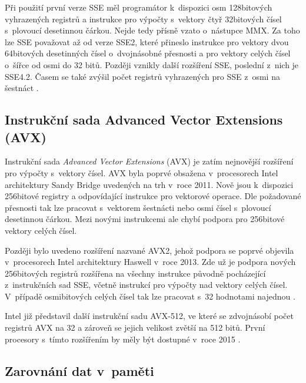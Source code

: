Při použití první verze SSE měl programátor k~dispozici osm 128bitových vyhrazených registrů a instrukce pro výpočty s~vektory čtyř 32bitových čísel s~plovoucí desetinnou čárkou. Nejde tedy přísně vzato o~nástupce MMX. Za toho lze SSE považovat až od verze SSE2, které přineslo instrukce pro vektory dvou 64bitových desetinných čísel o~dvojnásobné přesnosti a pro vektory celých čísel o~šířce od osmi do 32 bitů. Později vznikly další rozšíření SSE, poslední z~nich je SSE4.2. Časem se také zvýšil počet registrů vyhrazených pro SSE z~osmi na šestnáct \cite{IntelSSEDefine, IntelSSE}.






\subsection{Instrukční sada Advanced Vector Extensions (AVX)}


Instrukční sada \emph{Advanced Vector Extensions} (AVX) je zatím nejnovější rozšíření pro výpočty s~vektory čísel. AVX byla poprvé obsažena v~procesorech Intel architektury Sandy Bridge uvedených na trh v~roce 2011. Nově jsou k~dispozici 256bitové registry a odpovídající instrukce pro vektorové operace. Dle požadované přesnosti tak lze pracovat s~vektorem šestnácti nebo osmi čísel s~plovoucí desetinnou čárkou. Mezi novými instrukcemi ale chybí podpora pro 256bitové vektory celých čísel.

Později bylo uvedeno rozšíření nazvané AVX2, jehož podpora se poprvé objevila v~procesorech Intel architektury Haswell v~roce 2013. Zde už je podpora nových 256bitových registrů rozšířena na všechny instrukce původně pocházející z~instrukčních sad SSE, včetně instrukcí pro výpočty nad vektory celých čísel. V~případě osmibitových celých čísel tak lze pracovat s~32 hodnotami najednou \cite{IntelAVXReference}.

Intel již představil další instrukční sadu AVX-512, ve které se zdvojnásobí počet registrů AVX na 32 a zároveň se jejich velikost zvětší na 512 bitů. První procesory s~tímto rozšířením by měly být dostupné v~roce 2015 \cite{IntelAvx512}.

\subsection{Zarovnání dat v~paměti}

